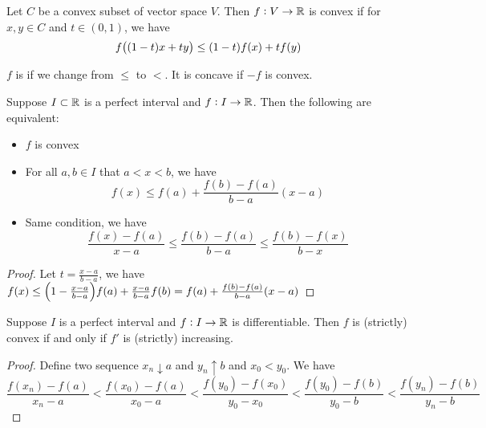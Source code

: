 \begin{definition}
    Let $C$ be a convex subset of vector space $V$. Then $f:V \rightarrow \mathbb{R}$ is convex if for $x,y \in C$ and $t \in (0,1)$, we have
    \begin{equation}
        f\mleft( (1-t)x + ty \mright) \leq (1-t) f(x) + t f(y)
    \end{equation}
    
    $f$ is  if we change from $\leq$ to $<$. It is concave if $-f$ is convex.
\end{definition}

\begin{theorem}
    Suppose $I \subset \mathbb{R}$ is a perfect interval and $f: I \rightarrow \mathbb{R}$. Then the following are equivalent:
    \begin{itemize}
        \item $f$ is convex
        \item For all $a,b \in I$ that $a < x < b$, we have \begin{equation}
            f(x) \leq f(a) + \frac{f(b) - f(a)}{b-a} (x-a)
        \end{equation}
        \item Same condition, we have \begin{equation}
            \frac{f(x) - f(a)}{x - a} \leq \frac{f(b) - f(a)}{b - a} \leq \frac{f(b) - f(x)}{b - x}
        \end{equation}
    \end{itemize}
\end{theorem}
\begin{proof}
    Let $t = \frac{x-a}{b-a}$, we have $f(x) \leq \mleft(1 - \frac{x-a}{b-a}\mright)f(a) + \frac{x-a}{b-a}f(b) = f(a) + \frac{f(b) - f(a)}{b-a}(x-a) $
\end{proof}

\begin{theorem}
    Suppose $I$ is a perfect interval and $f: I \rightarrow \mathbb{R}$ is differentiable. Then $f$ is (strictly) convex if and only if $f'$ is (strictly) increasing.
\end{theorem}
\begin{proof}
    Define two sequence $x_n \downarrow a$ and $y_n \uparrow b$ and $x_0 < y_0$. We have
    \begin{equation}
        \frac{f(x_n) - f(a)}{x_n - a} < \frac{f(x_0) - f(a)}{x_0 - a} < \frac{f(y_0) - f(x_0)}{y_0 - x_0} < \frac{f(y_0) - f(b)}{y_0 - b} < \frac{f(y_n) - f(b)}{y_n - b}
    \end{equation}
\end{proof}




